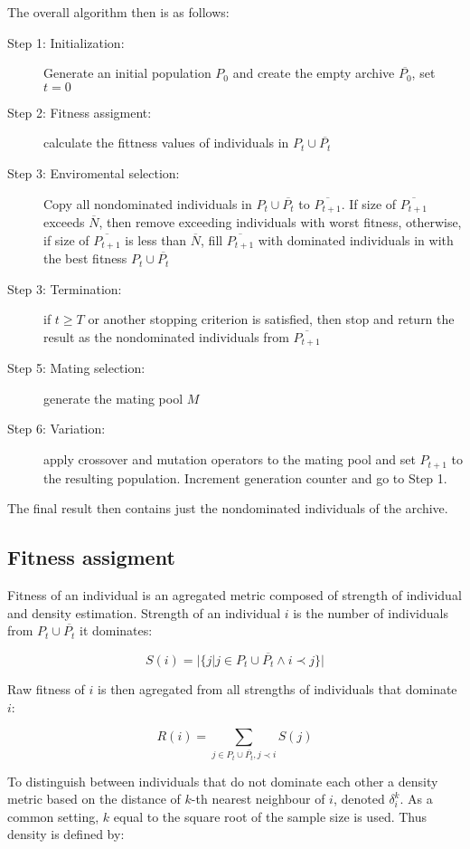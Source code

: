 \documentclass[12pt,oneside]{fithesis2}
\begin{document}
The overall algorithm then is as follows:

\begin{description}
	\item[Step 1: Initialization:] Generate an initial population $P_0$ and create the empty archive $\overline{P_0}$, set $t=0$
	\item[Step 2: Fitness assigment:] calculate the fittness values of individuals in $P_t \cup \overline{P_t}$
	\item[Step 3: Enviromental selection:] Copy all nondominated individuals in $P_t \cup \overline{P_t}$ to $\overline{P_{t+1}}$. If size of $\overline{P_{t+1}}$ exceeds $\overline N$, then remove exceeding individuals with worst fitness, otherwise, if size of $\overline{P_{t+1}}$ is less than $\overline N$, fill $\overline{P_{t+1}}$ with dominated individuals in  with the best fitness $P_t \cup \overline{P_t}$
	\item[Step 3: Termination:] if $t \geq T$ or another stopping criterion is satisfied, then stop and return the result as the nondominated individuals from $\overline{P_{t+1}}$
	\item[Step 5: Mating selection:] generate the mating pool $M$
	\item[Step 6: Variation:] apply crossover and mutation operators to the mating pool and set $P_{t+1}$ to the resulting population. Increment generation counter and go to Step 1.
\end{description}

The final result then contains just the nondominated individuals of the archive.

\subsection{Fitness assigment}
	Fitness of an individual is an agregated metric composed of strength of individual and density estimation. Strength of an individual $i$ is the number of individuals from $P_t \cup \overline{P_t}$ it dominates:

$$ S(i) = |\{j| j \in P_t \cup \overline{P_t} \land i \prec j\}| $$

Raw fitness of $i$ is then agregated from all strengths of individuals that dominate $i$:

$$ R(i) = \sum\limits_{j \in P_t \cup \overline{P_t},j \prec i} S(j)$$

To distinguish between individuals that do not dominate each other a density metric based on the distance of $k$-th nearest neighbour of $i$, denoted $\delta^k_i$. As a common setting, $k$ equal to the square root of the sample size is used. Thus density is defined by:
\end{document}
